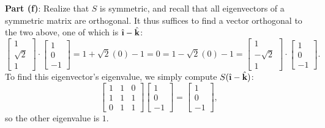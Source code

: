 \documentclass[11pt]{article}
\newcommand{\uvec}[1]{\mathop{} \!\hat{\textbf{#1}}}
\begin{document}
\textbf{Part (f)}: Realize that $S$ is symmetric, and recall that all eigenvectors of a symmetric matrix are orthogonal. It thus suffices to find a vector orthogonal to the two above, one of which is $\uvec{\i} - \uvec{k}$:
\[
	\begin{bmatrix} 1 \\ \sqrt{2} \\ 1 \end{bmatrix} \cdot \begin{bmatrix} 1 \\ 0 \\ -1 \end{bmatrix} = 1 + \sqrt{2}(0) - 1 = 0 = 1 - \sqrt{2}(0) -1 = \begin{bmatrix} 1 \\ -\sqrt{2} \\ 1 \end{bmatrix} \cdot \begin{bmatrix} 1 \\ 0 \\ -1 \end{bmatrix}.
\]
To find this eigenvector's eigenvalue, we simply compute $S(\uvec{\i} - \uvec{k})$:
\[
	\begin{bmatrix} 1 & 1 & 0 \\ 1 & 1 & 1 \\ 0 & 1 & 1 \end{bmatrix} \begin{bmatrix} 1 \\ 0 \\ -1 \end{bmatrix} = \begin{bmatrix} 1 \\ 0 \\ -1 \end{bmatrix},
\]
so the other eigenvalue is $\boxed{1}$.
\end{document}
